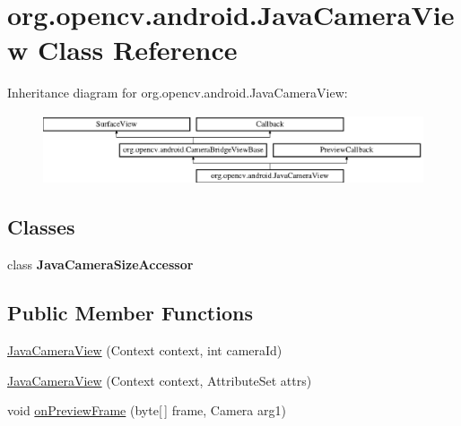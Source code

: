 \hypertarget{classorg_1_1opencv_1_1android_1_1_java_camera_view}{}\section{org.\+opencv.\+android.\+Java\+Camera\+View Class Reference}
\label{classorg_1_1opencv_1_1android_1_1_java_camera_view}
Inheritance diagram for org.\+opencv.\+android.\+Java\+Camera\+View\+:\begin{figure}[H]
\begin{center}
\leavevmode
\includegraphics[height=2.051282cm]{classorg_1_1opencv_1_1android_1_1_java_camera_view}
\end{center}
\end{figure}
\subsection*{Classes}
\begin{DoxyCompactItemize}
\item 
class {\bfseries Java\+Camera\+Size\+Accessor}
\end{DoxyCompactItemize}
\subsection*{Public Member Functions}
\begin{DoxyCompactItemize}
\item 
\mbox{\hyperlink{classorg_1_1opencv_1_1android_1_1_java_camera_view_aba18d30cb50b833f3bf8281c1758adf1}{Java\+Camera\+View}} (Context context, int camera\+Id)
\item 
\mbox{\hyperlink{classorg_1_1opencv_1_1android_1_1_java_camera_view_ade245d8e3c82c62e512cd031cc041a76}{Java\+Camera\+View}} (Context context, Attribute\+Set attrs)
\item 
void \mbox{\hyperlink{classorg_1_1opencv_1_1android_1_1_java_camera_view_a16ba3b94c94ca2afe069e82a2cf20e58}{on\+Preview\+Frame}} (byte\mbox{[}$\,$\mbox{]} frame, Camera arg1)
\end{DoxyCompactItemize}
